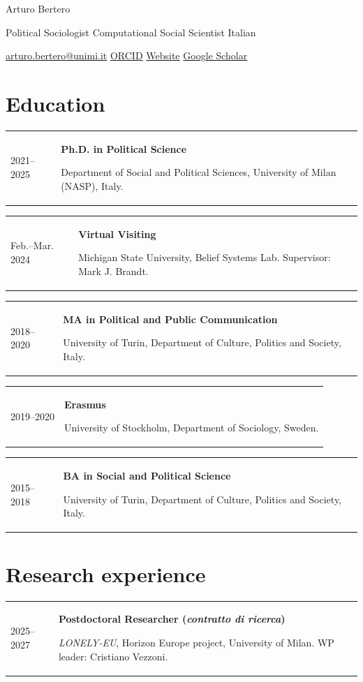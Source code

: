 \documentclass[10pt,a4paper]{article}
\makeatletter
\newlength{\yearw}\setlength{\yearw}{2.3cm}
\newlength{\bodyw}\setlength{\bodyw}{\dimexpr\textwidth-\yearw-0.45cm\relax}
\newcommand{\cv}[2]{%
  \needspace{2\baselineskip}%
  \par\noindent
  \begin{tabular}{@{}>{\raggedright\arraybackslash}p{\yearw}@{\hspace{0.45cm}}>{\raggedright\arraybackslash}p{\bodyw}@{}}
    \sanslabel\fontsize{8.5}{10.5}\selectfont\color{muted}#1 & #2
  \end{tabular}%
  \par\vspace{3pt}%
}
\newcommand{\role}[1]{\textbf{#1}\par}
\newcommand{\venue}[1]{\textit{#1}}
\makeatother
\begin{document}
{\fontsize{25}{27}\selectfont Arturo Bertero}\par\vspace{4pt}
{\sanslabel\fontsize{9.5}{12}\selectfont\color{muted}%
Political Sociologist \quad\textbullet\quad Computational Social Scientist \quad\textbullet\quad Italian}\par
{}\vspace{5pt}
{\sanslabel\fontsize{9}{12}\selectfont
\href{mailto:arturo.bertero@unimi.it}{arturo.bertero@unimi.it} \quad\textbullet\quad
\href{https://orcid.org/0000-0001-6014-1794}{ORCID} \quad\textbullet\quad
\href{https://arturobertero.github.io/}{Website} \quad\textbullet\quad
\href{https://scholar.google.com/citations?user=C5ps1gwAAAAJ&hl=it}{Google Scholar}}\par

\section{Education}

\cv{2021–2025}{\role{Ph.D. in Political Science}
Department of Social and Political Sciences, University of Milan (NASP), Italy.}

\cv{Feb.–Mar. 2024}{\role{Virtual Visiting}
Michigan State University, Belief Systems Lab. Supervisor: Mark J. Brandt.}

\cv{2018–2020}{\role{MA in Political and Public Communication}
University of Turin, Department of Culture, Politics and Society, Italy.}

\cv{2019–2020}{\role{Erasmus}
University of Stockholm, Department of Sociology, Sweden.}

\cv{2015–2018}{\role{BA in Social and Political Science}
University of Turin, Department of Culture, Politics and Society, Italy.}

\section{Research experience}

\cv{2025–2027}{\role{Postdoctoral Researcher (\textit{contratto di ricerca})}
\venue{LONELY-EU}, Horizon Europe project, University of Milan. WP leader: Cristiano Vezzoni.}
\end{document}

